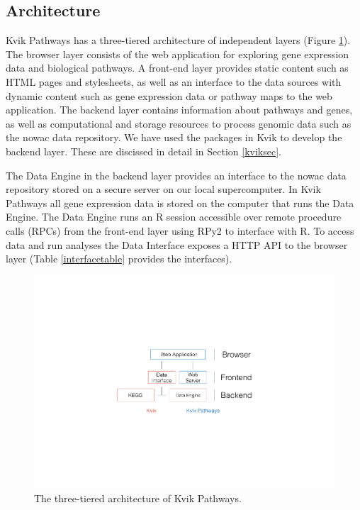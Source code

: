 \subsection{Architecture} 
Kvik Pathways has a three-tiered architecture of independent layers (Figure
\ref{fig:arch}). The browser layer consists of the web application for
exploring gene expression data and biological pathways. A front-end layer
provides static content such as HTML pages and stylesheets, as well as an
interface to the data sources with dynamic content such as gene expression
data or pathway maps to the web application. The backend layer contains
information about pathways and genes, as well as computational and storage
resources to process genomic data such as the \gls{nowac}  data repository. We
have used the packages in Kvik to develop the backend layer. These are discissed
in detail in Section \ref{kviksec}. 

The Data Engine in the backend layer provides an interface to the \gls{nowac}
data repository stored on a secure server on our local supercomputer. In Kvik
Pathways all gene expression data is stored on the computer that runs the Data
Engine. The Data Engine runs an R session accessible over remote procedure calls
(RPCs) from the front-end layer using RPy2\cite{rpy2} to interface with R. To
access data and run analyses the Data Interface exposes a HTTP API to the
browser layer (Table \ref{interfacetable} provides the interfaces).

\begin{figure}[htb]
    \begin{centering}
    \includegraphics[width=\textwidth]{figures/archv2-name-fix.pdf}
    \caption{The three-tiered architecture of Kvik Pathways.} 
    \label{fig:arch}
    \end{centering} 
\end{figure}   

